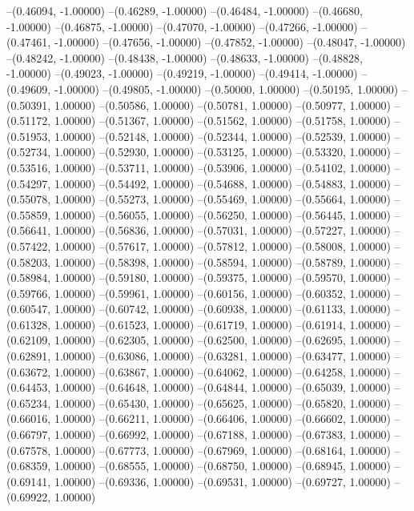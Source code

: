 --(0.46094, -1.00000)
--(0.46289, -1.00000)
--(0.46484, -1.00000)
--(0.46680, -1.00000)
--(0.46875, -1.00000)
--(0.47070, -1.00000)
--(0.47266, -1.00000)
--(0.47461, -1.00000)
--(0.47656, -1.00000)
--(0.47852, -1.00000)
--(0.48047, -1.00000)
--(0.48242, -1.00000)
--(0.48438, -1.00000)
--(0.48633, -1.00000)
--(0.48828, -1.00000)
--(0.49023, -1.00000)
--(0.49219, -1.00000)
--(0.49414, -1.00000)
--(0.49609, -1.00000)
--(0.49805, -1.00000)
--(0.50000, 1.00000)
--(0.50195, 1.00000)
--(0.50391, 1.00000)
--(0.50586, 1.00000)
--(0.50781, 1.00000)
--(0.50977, 1.00000)
--(0.51172, 1.00000)
--(0.51367, 1.00000)
--(0.51562, 1.00000)
--(0.51758, 1.00000)
--(0.51953, 1.00000)
--(0.52148, 1.00000)
--(0.52344, 1.00000)
--(0.52539, 1.00000)
--(0.52734, 1.00000)
--(0.52930, 1.00000)
--(0.53125, 1.00000)
--(0.53320, 1.00000)
--(0.53516, 1.00000)
--(0.53711, 1.00000)
--(0.53906, 1.00000)
--(0.54102, 1.00000)
--(0.54297, 1.00000)
--(0.54492, 1.00000)
--(0.54688, 1.00000)
--(0.54883, 1.00000)
--(0.55078, 1.00000)
--(0.55273, 1.00000)
--(0.55469, 1.00000)
--(0.55664, 1.00000)
--(0.55859, 1.00000)
--(0.56055, 1.00000)
--(0.56250, 1.00000)
--(0.56445, 1.00000)
--(0.56641, 1.00000)
--(0.56836, 1.00000)
--(0.57031, 1.00000)
--(0.57227, 1.00000)
--(0.57422, 1.00000)
--(0.57617, 1.00000)
--(0.57812, 1.00000)
--(0.58008, 1.00000)
--(0.58203, 1.00000)
--(0.58398, 1.00000)
--(0.58594, 1.00000)
--(0.58789, 1.00000)
--(0.58984, 1.00000)
--(0.59180, 1.00000)
--(0.59375, 1.00000)
--(0.59570, 1.00000)
--(0.59766, 1.00000)
--(0.59961, 1.00000)
--(0.60156, 1.00000)
--(0.60352, 1.00000)
--(0.60547, 1.00000)
--(0.60742, 1.00000)
--(0.60938, 1.00000)
--(0.61133, 1.00000)
--(0.61328, 1.00000)
--(0.61523, 1.00000)
--(0.61719, 1.00000)
--(0.61914, 1.00000)
--(0.62109, 1.00000)
--(0.62305, 1.00000)
--(0.62500, 1.00000)
--(0.62695, 1.00000)
--(0.62891, 1.00000)
--(0.63086, 1.00000)
--(0.63281, 1.00000)
--(0.63477, 1.00000)
--(0.63672, 1.00000)
--(0.63867, 1.00000)
--(0.64062, 1.00000)
--(0.64258, 1.00000)
--(0.64453, 1.00000)
--(0.64648, 1.00000)
--(0.64844, 1.00000)
--(0.65039, 1.00000)
--(0.65234, 1.00000)
--(0.65430, 1.00000)
--(0.65625, 1.00000)
--(0.65820, 1.00000)
--(0.66016, 1.00000)
--(0.66211, 1.00000)
--(0.66406, 1.00000)
--(0.66602, 1.00000)
--(0.66797, 1.00000)
--(0.66992, 1.00000)
--(0.67188, 1.00000)
--(0.67383, 1.00000)
--(0.67578, 1.00000)
--(0.67773, 1.00000)
--(0.67969, 1.00000)
--(0.68164, 1.00000)
--(0.68359, 1.00000)
--(0.68555, 1.00000)
--(0.68750, 1.00000)
--(0.68945, 1.00000)
--(0.69141, 1.00000)
--(0.69336, 1.00000)
--(0.69531, 1.00000)
--(0.69727, 1.00000)
--(0.69922, 1.00000)
